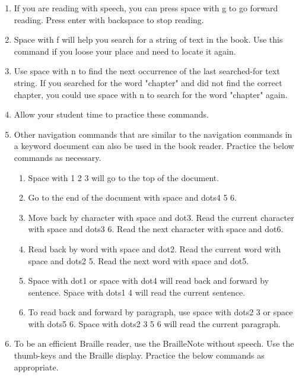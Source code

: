 \documentclass[10pt,letterpaper,twoside]{report}
\begin{document}
{{{\begin{enumerate}
\begin{enumerate}
		      \item Review commands
		      \item Braille thumb-key commands
		      \item Miscellaneous commands
	      \end{enumerate}
	\item If you are reading with speech, you can press space with g to go forward reading.  Press enter with backspace to stop reading.
	\item Space with f will help you search for a string of text in the book. Use this command if you loose your place and need to locate it again.
	\item Use space with n to find the next occurrence of the last searched-for text string.  If you searched for the word "chapter" and did not find the correct chapter, you could use space with n to search for the word "chapter" again.
	\item Allow your student time to practice these commands.
	\item Other navigation commands that are similar to the navigation commands in a keyword document can also be used in the book reader.  Practice the below commands as necessary.
	      \begin{enumerate}
		      \item Space with 1 2 3 will go to the top of the document.
		      \item Go to the end of the document with space and dots4 5 6.
		      \item Move back by character with space and dot3. Read the current character with space and dots3 6.  Read the next character with space and dot6.
		      \item Read back by word with space and dot2. Read the current word with space and dots2 5.  Read the next word with space and dot5.
		      \item Space with dot1 or space with dot4 will read back and forward by sentence.  Space with dots1 4 will read the current sentence.
		      \item To read back and forward by paragraph, use space with dots2 3 or space with dots5 6.  Space with dots2 3 5 6 will read the current paragraph.
	      \end{enumerate}
	\item To be an efficient Braille reader, use the BrailleNote without speech.  Use the thumb-keys and the Braille display.  Practice the below commands as appropriate.
	      \begin{enumerate}

\end{enumerate}
\end{enumerate}}}}
\end{document}
